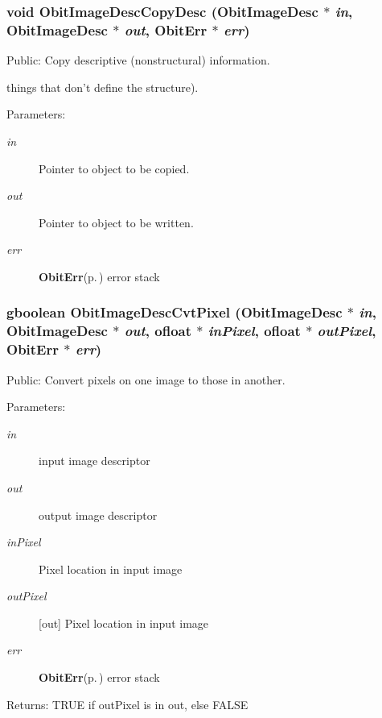 \subsubsection{\setlength{\rightskip}{0pt plus 5cm}void Obit\-Image\-Desc\-Copy\-Desc ({\bf Obit\-Image\-Desc} $\ast$ {\em in}, {\bf Obit\-Image\-Desc} $\ast$ {\em out}, {\bf Obit\-Err} $\ast$ {\em err})}\label{ObitImageDesc_8c_a9}


Public: Copy descriptive (nonstructural) information. 

things that don't define the structure). \begin{Desc}
\item[Parameters:]
\begin{description}
\item[{\em in}]Pointer to object to be copied. \item[{\em out}]Pointer to object to be written. \item[{\em err}]{\bf Obit\-Err}{\rm (p.\,\pageref{structObitErr})} error stack \end{description}
\end{Desc}
\subsubsection{\setlength{\rightskip}{0pt plus 5cm}gboolean Obit\-Image\-Desc\-Cvt\-Pixel ({\bf Obit\-Image\-Desc} $\ast$ {\em in}, {\bf Obit\-Image\-Desc} $\ast$ {\em out}, {\bf ofloat} $\ast$ {\em in\-Pixel}, {\bf ofloat} $\ast$ {\em out\-Pixel}, {\bf Obit\-Err} $\ast$ {\em err})}\label{ObitImageDesc_8c_a12}


Public: Convert pixels on one image to those in another. 

\begin{Desc}
\item[Parameters:]
\begin{description}
\item[{\em in}]input image descriptor \item[{\em out}]output image descriptor \item[{\em in\-Pixel}]Pixel location in input image \item[{\em out\-Pixel}][out] Pixel location in input image \item[{\em err}]{\bf Obit\-Err}{\rm (p.\,\pageref{structObitErr})} error stack \end{description}
\end{Desc}
\begin{Desc}
\item[Returns:]TRUE if out\-Pixel is in out, else FALSE \end{Desc}
